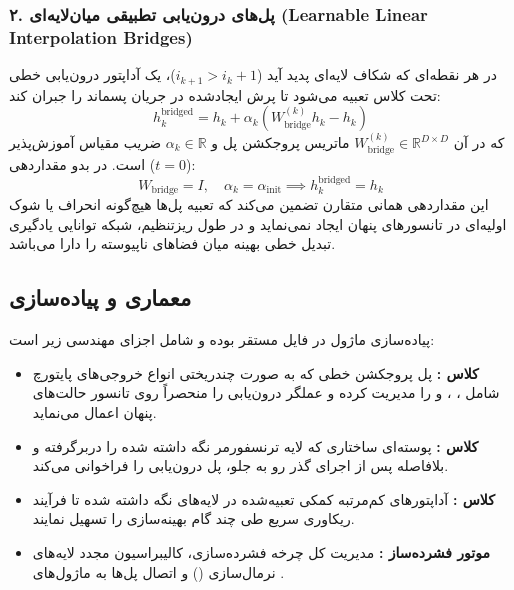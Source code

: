 \subsubsection*{۲. پل‌های درون‌یابی تطبیقی میان‌لایه‌ای (Learnable Linear Interpolation Bridges)}
در هر نقطه‌ای که شکاف لایه‌ای پدید آید ($i_{k+1} > i_k + 1$)، یک آداپتور درون‌یابی خطی تحت کلاس  تعبیه می‌شود تا پرش ایجادشده در جریان پسماند را جبران کند:
\begin{equation}
h_k^{\text{bridged}} = h_k + \alpha_k \left( W_{\text{bridge}}^{(k)} h_k - h_k \right)
\end{equation}
که در آن $W_{\text{bridge}}^{(k)} \in \mathbb{R}^{D \times D}$ ماتریس پروجکشن پل و $\alpha_k \in \mathbb{R}$ ضریب مقیاس آموزش‌پذیر است. در بدو مقداردهی ($t=0$):
\begin{equation}
W_{\text{bridge}} = I, \quad \alpha_k = \alpha_{\text{init}} \implies h_k^{\text{bridged}} = h_k
\end{equation}
این مقداردهی همانی متقارن تضمین می‌کند که تعبیه پل‌ها هیچ‌گونه انحراف یا شوک اولیه‌ای در تانسورهای پنهان ایجاد نمی‌نماید و در طول ریزتنظیم، شبکه توانایی یادگیری تبدیل خطی بهینه میان فضاهای ناپیوسته را دارا می‌باشد.

\subsection{معماری و پیاده‌سازی}
پیاده‌سازی ماژول در فایل  مستقر بوده و شامل اجزای مهندسی زیر است:
\begin{itemize}
    \item \textbf{کلاس :} پل پروجکشن خطی که به صورت چندریختی انواع خروجی‌های پایتورچ شامل ، ،  و  را مدیریت کرده و عملگر درون‌یابی را منحصراً روی تانسور حالت‌های پنهان اعمال می‌نماید.
    \item \textbf{کلاس :} پوسته‌ای ساختاری که لایه ترنسفورمر نگه داشته شده را دربرگرفته و بلافاصله پس از اجرای گذر رو به جلو، پل درون‌یابی را فراخوانی می‌کند.
    \item \textbf{کلاس :} آداپتورهای کم‌مرتبه  کمکی تعبیه‌شده در لایه‌های نگه داشته شده تا فرآیند ریکاوری سریع طی چند گام بهینه‌سازی را تسهیل نمایند.
    \item \textbf{موتور فشرده‌ساز :} مدیریت کل چرخه فشرده‌سازی، کالیبراسیون مجدد لایه‌های نرمال‌سازی () و اتصال پل‌ها به ماژول‌های .
\end{itemize}


